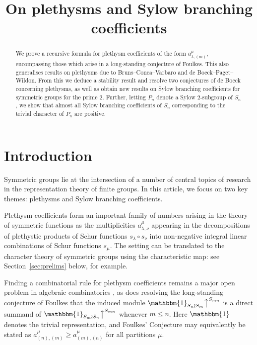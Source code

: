 \documentclass[ALCO, Unicode]{cedram}
\title{On plethysms and Sylow branching coefficients}
\author[\initial{S.} Law]{\firstname{Stacey} \lastname{Law}}
\author[\initial{Y.} Okitani]{\firstname{Yuji} \lastname{Okitani}}
\newcommand{\triv}{\mathbbm{1}}
\newcommand{\up}{\big\uparrow}
\begin{document}
	
\begin{abstract}
  We prove a recursive formula for plethysm coefficients of the form $a^\mu_{\lambda,(m)}$, encompassing those which arise in a long-standing conjecture of Foulkes. This also generalises results on plethysms due to Bruns--Conca--Varbaro and de Boeck--Paget--Wildon. From this we deduce a stability result and resolve two conjectures of de Boeck concerning plethysms, as well as obtain new results on Sylow branching coefficients for symmetric groups for the prime 2. Further, letting $P_n$ denote a Sylow 2-subgroup of $S_n$, we show that almost all Sylow branching coefficients of $S_n$ corresponding to the trivial character of $P_n$ are positive.
\end{abstract}

\maketitle



\section{Introduction}

Symmetric groups lie at the intersection of a number of central topics of research in the representation theory of finite groups. In this article, we focus on two key themes: plethysms and Sylow branching coefficients.

Plethysm coefficients form an important family of numbers arising in the theory of symmetric functions as the multiplicities $a^\mu_{\lambda,\nu}$ appearing in the decompositions of plethystic products of Schur functions $s_\lambda\circ s_\nu$ into non-negative integral linear combinations of Schur functions $s_\mu$. The setting can be translated to the character theory of symmetric groups using the characteristic map: see Section~\ref{sec:prelims} below, for example. 

Finding a combinatorial rule for plethysm coefficients remains a major open problem in algebraic combinatorics \cite[Problem 9]{Sta-OP}, as does resolving the long-standing conjecture of Foulkes \cite{Foulkes} that the induced module $\triv_{S_n\wr S_m}\up^{S_{mn}}$ is a direct summand of $\triv_{S_m\wr S_n}\up^{S_{mn}}$ whenever $m\le n$. Here $\triv$ denotes the trivial representation, and Foulkes' Conjecture may equivalently be stated as $a^\mu_{(n),(m)}\ge a^\mu_{(m),(n)}$ for all partitions $\mu$.
\end{document}
